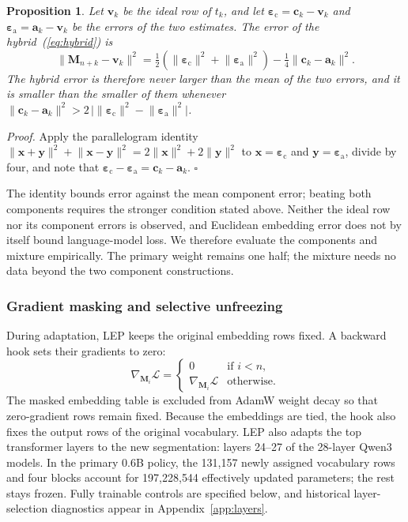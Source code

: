 \documentclass{ieeeaccess}
\newtheorem{proposition}{Proposition}
\begin{document}
\begin{proposition}
\label{prop:hybrid}
Let $\bm{v}_k$ be the ideal row of $t_k$, and let $\bm{\varepsilon}_{\mathrm{c}} = \bm{c}_k - \bm{v}_k$ and
$\bm{\varepsilon}_{\mathrm{a}} = \bm{a}_k - \bm{v}_k$ be the errors of the two estimates. The error of
the hybrid~(\ref{eq:hybrid}) is
\begin{equation}
\lVert \bm{M}_{n+k} - \bm{v}_k \rVert^2
= \tfrac{1}{2}\left(\lVert\bm{\varepsilon}_{\mathrm{c}}\rVert^2 + \lVert\bm{\varepsilon}_{\mathrm{a}}\rVert^2\right)
- \tfrac{1}{4}\lVert \bm{c}_k - \bm{a}_k \rVert^2 .
\end{equation}
The hybrid error is therefore never larger than the mean of the two errors,
and it is smaller than the smaller of them whenever
$\lVert \bm{c}_k - \bm{a}_k \rVert^2 > 2\,\bigl|\lVert\bm{\varepsilon}_{\mathrm{c}}\rVert^2 - \lVert\bm{\varepsilon}_{\mathrm{a}}\rVert^2\bigr|$.
\end{proposition}

\emph{Proof.} Apply the parallelogram identity
$\lVert \bm{x} + \bm{y}\rVert^2 + \lVert \bm{x} - \bm{y}\rVert^2 = 2\lVert \bm{x}\rVert^2 + 2\lVert \bm{y}\rVert^2$
to $\bm{x} = \bm{\varepsilon}_{\mathrm{c}}$ and $\bm{y} = \bm{\varepsilon}_{\mathrm{a}}$, divide by four, and note that
$\bm{\varepsilon}_{\mathrm{c}} - \bm{\varepsilon}_{\mathrm{a}} = \bm{c}_k - \bm{a}_k$. \hfill$\square$

The identity bounds error against the mean component error; beating both
components requires the stronger condition stated above. Neither the ideal
row nor its component errors is observed, and Euclidean embedding error
does not by itself bound language-model loss. We therefore evaluate the
components and mixture empirically. The primary weight remains one half;
the mixture needs no data beyond the two component constructions.

\subsubsection{Gradient masking and selective unfreezing}

During adaptation, LEP keeps the original embedding rows fixed. A backward
hook sets their gradients to zero:
\begin{equation}
\nabla_{\bm{M}_i} \mathcal{L} =
\begin{cases}
0 & \text{if } i < n, \\
\nabla_{\bm{M}_i} \mathcal{L} & \text{otherwise.}
\end{cases}
\label{eq:mask}
\end{equation}
The masked embedding table is excluded from AdamW weight decay so that
zero-gradient rows remain fixed. Because the embeddings are tied, the hook also fixes the output rows of the
original vocabulary. LEP also adapts the top transformer layers to the new
segmentation: layers 24--27 of the 28-layer Qwen3 models. In the primary
0.6B policy, the 131{,}157 newly assigned vocabulary rows and four blocks
account for 197{,}228{,}544 effectively updated parameters; the rest stays
frozen. Fully trainable controls are specified below, and historical
layer-selection diagnostics appear in Appendix~\ref{app:layers}.
\end{document}

